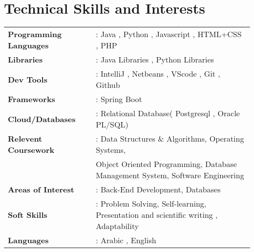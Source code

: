 \documentclass[a4paper,11pt]{article}
\makeatletter
\newcommand{\resumePOR}[3]{
\vspace{0.5mm}\item
    \begin{tabular*}{0.97\textwidth}[t]{l@{\extracolsep{\fill}}r}
        \textbf{#1}\hspace{0.3mm}#2 & \textit{\small{#3}} 
    \end{tabular*}
    \vspace{-2mm}
}
\newcommand{\resumeSubHeadingListStart}{\begin{itemize}[leftmargin=*,labelsep=0mm]}
\newcommand{\resumeItemListStart}{\begin{justify}\begin{itemize}[leftmargin=3ex, rightmargin=2ex, noitemsep,labelsep=1.2mm,itemsep=0mm]\small}
\newcommand{\resumeSubHeadingListEnd}{\end{itemize}\vspace{2mm}}
\newcommand{\resumeItemListEnd}{\end{itemize}\end{justify}\vspace{-2mm}}
\makeatother
\begin{document}
      







\section{\textbf{Technical Skills and Interests}}
 \begin{itemize}[leftmargin=0.05in, label={}]
    \small{\item{
      \begin{tabular}[h]{l l}
        
     
     \textbf{Programming Languages}\hspace*{.15cm}& : Java , Python , Javascript , HTML+CSS , PHP \\
     \textbf{Libraries }& : Java Libraries , Python Libraries\\ 
     \textbf{Dev Tools}& : IntelliJ , Netbeans , VScode , Git , Github  \\ 
     \textbf{Frameworks}& : Spring Boot  \\
     \textbf{Cloud/Databases}& : Relational Database( Postgresql , Oracle PL/SQL)  \\  
     \textbf{Relevent Coursework}& : Data Structures \& Algorithms, Operating Systems, \\ 
                                 &\hspace*{.15cm}  Object Oriented Programming, Database Management System, Software Engineering \\
     \textbf{Areas of Interest}& : Back-End Development, Databases \\
     \textbf{Soft Skills}& : Problem Solving, Self-learning, Presentation and scientific writing , Adaptability \\
     \textbf{Languages}& : Arabic , English \\
    \end{tabular}
    }}
 \end{itemize}
 \vspace{-16pt}



\end{document}
